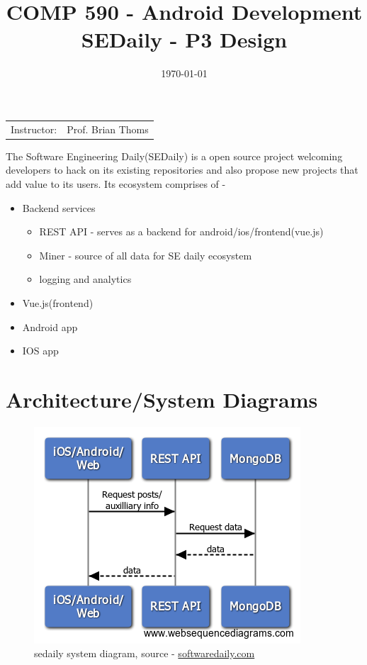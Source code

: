 \documentclass{article}
\title{COMP 590 - Android Development \\ SEDaily - P3 Design} %
\author{\hmwkAuthorName} %
\date{\today} %
\begin{document}
\maketitle %

\begin{center}
\begin{tabular}{l r}
Instructor: & Prof. Brian Thoms%
\end{tabular}
\end{center}


The Software Engineering Daily(SEDaily) is a open source project welcoming developers to hack on
its existing repositories and also propose new projects that add value to its users. Its ecosystem
comprises of - 

\begin{itemize}
\item Backend services
  \begin{itemize}
    \item REST API - serves as a backend for android/ios/frontend(vue.js)
    \item Miner - source of all data for SE daily ecosystem
    \item logging and analytics
  \end{itemize} 
\item Vue.js(frontend)
\item Android app
\item IOS app
\end{itemize}

\clearpage

\section{Architecture/System Diagrams}
\begin{figure}[h]
  \centering
  \includegraphics[width=.5\linewidth]{img/system_diagram.png}
  \caption{sedaily system diagram, source - \href{https://www.softwaredaily.com/}{softwaredaily.com}}
\end{figure}
\end{document}
